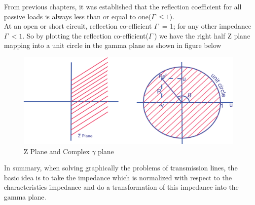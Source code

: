 From previous chapters, it was established that the reflection coefficient for all passive loads is always less than or equal to one($ \Gamma\ \leq 1).$\\
At an open or short circuit, reflection co-efficient $ \Gamma\ $ = 1; for any other impedance $ \Gamma\  < 1$.  So by plotting the reflection co-efficient($ \Gamma\ $) we have the right half Z plane mapping into a unit circle in the gamma plane as shown in figure below
\begin{figure}[h]
\centering
\includegraphics[width=0.7\linewidth]{./graphics/oiuhgvcx}
\caption{Z Plane and Complex $\gamma$ plane}
\label{fig:oiuhgvcx}
\end{figure}

In summary, when solving graphically the problems of transmission lines, the basic idea is to take the impedance which is normalized with respect to the characteristics impedance and do a transformation of this impedance into the gamma plane.

